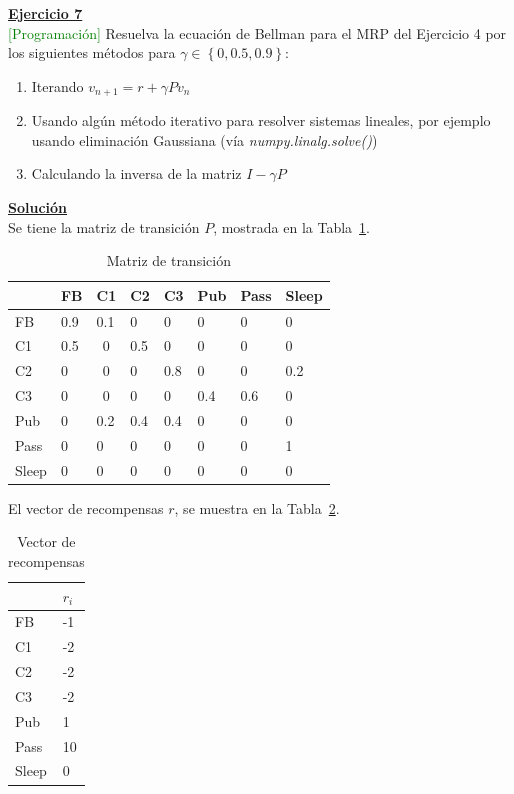 \indent\underline{\textbf{Ejercicio 7}}\\
\textcolor{green}{[Programación]} Resuelva la ecuación de Bellman para el MRP del Ejercicio 4 por los siguientes métodos para $\gamma \in \left\{0, 0.5, 0.9\right\}$:

\begin{enumerate}
    \item Iterando $v_{n+1} = r + \gamma P v_n$
    \item Usando algún método iterativo para resolver sistemas lineales, por ejemplo usando eliminación Gaussiana (vía \textit{numpy.linalg.solve()})
    \item Calculando la inversa de la matriz $I - \gamma P$
\end{enumerate}

\indent\underline{\textbf{Solución}}\\


Se tiene la matriz de transición $P$, mostrada en la Tabla~\ref{tab:p_matrix}.

\begin{table}[H]
    \centering
    \caption{Matriz de transición}
    \label{tab:p_matrix}
    \begin{tabular}{l|l|l|l|l|l|l|l}
        & FB  & C1                     & C2  & C3  & Pub & Pass & Sleep \\ \hline
        FB    & 0.9 & 0.1                    & 0   & 0   & 0   & 0    & 0     \\ \hline
        C1    & 0.5 & \multicolumn{1}{c|}{0} & 0.5 & 0   & 0   & 0    & 0     \\ \hline
        C2    & 0   & \multicolumn{1}{c|}{0} & 0   & 0.8 & 0   & 0    & 0.2   \\ \hline
        C3    & 0   & \multicolumn{1}{c|}{0} & 0   & 0   & 0.4 & 0.6  & 0     \\ \hline
        Pub   & 0   & 0.2                    & 0.4 & 0.4 & 0   & 0    & 0     \\ \hline
        Pass  & 0   & 0                      & 0   & 0   & 0   & 0    & 1     \\ \hline
        Sleep & 0   & 0                      & 0   & 0   & 0   & 0    & 0
    \end{tabular}
\end{table}

El vector de recompensas $r$, se muestra en la Tabla~\ref{tab:r_vector}.

\begin{table}[H]
    \centering
    \caption{Vector de recompensas}
    \label{tab:r_vector}
    \begin{tabular}{l|l}
        & $r_i$ \\ \hline
        FB    & -1    \\ \hline
        C1    & -2    \\ \hline
        C2    & -2    \\ \hline
        C3    & -2    \\ \hline
        Pub   & 1     \\ \hline
        Pass  & 10    \\ \hline
        Sleep & 0
    \end{tabular}
\end{table}

